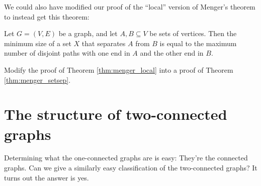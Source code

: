 \documentclass[nobib]{tufte-handout}
\begin{document}
We could also have modified our proof of the ``local'' version of Menger's theorem to instead get this theorem:

\begin{theorem}[Menger]\label{thm:menger_setsep}
  Let $G = (V,E)$ be a graph, and let $A, B \subseteq V$ be sets of vertices. Then the minimum size of a set $X$ that separates $A$ from $B$ is equal to the maximum number of disjoint paths with one end in $A$ and the other end in $B$.
\end{theorem}

\begin{xca}
  Modify the proof of Theorem \ref{thm:menger_local} into a proof of Theorem \ref{thm:menger_setsep}.
\end{xca}

\section{The structure of two-connected graphs}

Determining what the one-connected graphs are is easy: They're the connected graphs. Can we give a similarly easy classification of the two-connected graphs? It turns out the answer is yes.
\end{document}
